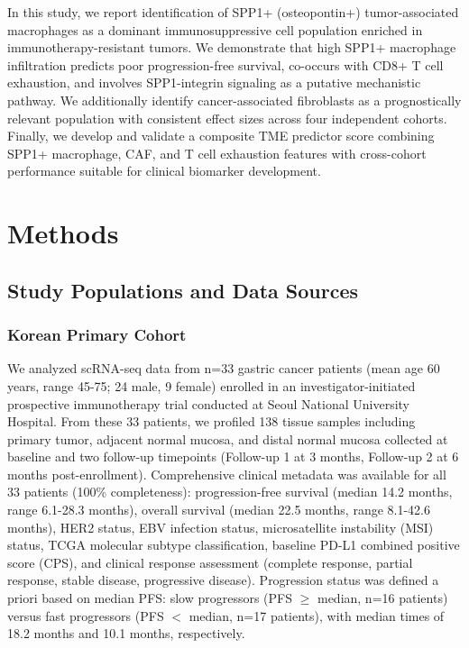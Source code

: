 \documentclass[12pt,twoside]{article}
\begin{document}
In this study, we report identification of SPP1+ (osteopontin+) tumor-associated macrophages as a dominant immunosuppressive cell population enriched in immunotherapy-resistant tumors. We demonstrate that high SPP1+ macrophage infiltration predicts poor progression-free survival, co-occurs with CD8+ T cell exhaustion, and involves SPP1-integrin signaling as a putative mechanistic pathway. We additionally identify cancer-associated fibroblasts as a prognostically relevant population with consistent effect sizes across four independent cohorts. Finally, we develop and validate a composite TME predictor score combining SPP1+ macrophage, CAF, and T cell exhaustion features with cross-cohort performance suitable for clinical biomarker development.


\section{Methods}

\subsection{Study Populations and Data Sources}

\subsubsection{Korean Primary Cohort}

We analyzed scRNA-seq data from n=33 gastric cancer patients (mean age 60 years, range 45-75; 24 male, 9 female) enrolled in an investigator-initiated prospective immunotherapy trial conducted at Seoul National University Hospital. From these 33 patients, we profiled 138 tissue samples including primary tumor, adjacent normal mucosa, and distal normal mucosa collected at baseline and two follow-up timepoints (Follow-up 1 at 3 months, Follow-up 2 at 6 months post-enrollment). Comprehensive clinical metadata was available for all 33 patients (100\% completeness): progression-free survival (median 14.2 months, range 6.1-28.3 months), overall survival (median 22.5 months, range 8.1-42.6 months), HER2 status, EBV infection status, microsatellite instability (MSI) status, TCGA molecular subtype classification, baseline PD-L1 combined positive score (CPS), and clinical response assessment (complete response, partial response, stable disease, progressive disease). Progression status was defined a priori based on median PFS: slow progressors (PFS $\geq$ median, n=16 patients) versus fast progressors (PFS $<$ median, n=17 patients), with median times of 18.2 months and 10.1 months, respectively.
\end{document}

